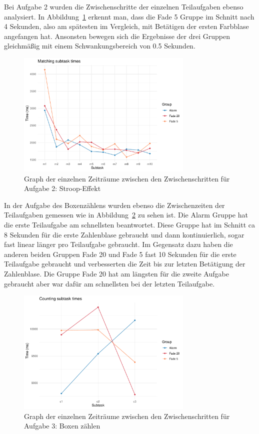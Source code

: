 Bei Aufgabe 2 wurden die Zwischenschritte der einzelnen Teilaufgaben ebenso analysiert. In Abbildung~\ref{fig:timeTask2} erkennt man, dass die Fade 5 Gruppe im Schnitt nach 4 Sekunden, also am spätesten im Vergleich, mit Betätigen der ersten Farbblase angefangen hat. Ansonsten bewegen sich die Ergebnisse der drei Gruppen gleichmäßig mit einem Schwankungsbereich von 0.5 Sekunden.

\begin{figure}[H]
	\centering
	\includegraphics[width=0.75\textwidth]{./_StudyResults/timeTask2}
	\caption{Graph der einzelnen Zeiträume zwischen den Zwischenschritten für Aufgabe 2: Stroop-Effekt}
	\label{fig:timeTask2}
\end{figure}

In der Aufgabe des Boxenzählens wurden ebenso die Zwischenzeiten der Teilaufgaben gemessen wie in Abbildung~\ref{fig:timeTask3} zu sehen ist. Die Alarm Gruppe hat die erste Teilaufgabe am schnellsten beantwortet. Diese Gruppe hat im Schnitt ca 8 Sekunden für die erste Zahlenblase gebraucht und dann kontinuierlich, sogar fast linear länger pro Teilaufgabe gebraucht. Im Gegensatz dazu haben die anderen beiden Gruppen Fade 20 und Fade 5 fast 10 Sekunden für die erste Teilaufgabe gebraucht und verbesserten die Zeit bis zur letzten Betätigung der Zahlenblase. Die Gruppe Fade 20 hat am längsten für die zweite Aufgabe gebraucht aber war dafür am schnellsten bei der letzten Teilaufgabe.

\begin{figure}[H]
	\centering
	\includegraphics[width=0.75\textwidth]{./_StudyResults/timeTask3}
	\caption{Graph der einzelnen Zeiträume zwischen den Zwischenschritten für Aufgabe 3: Boxen zählen}
	\label{fig:timeTask3}
\end{figure}


